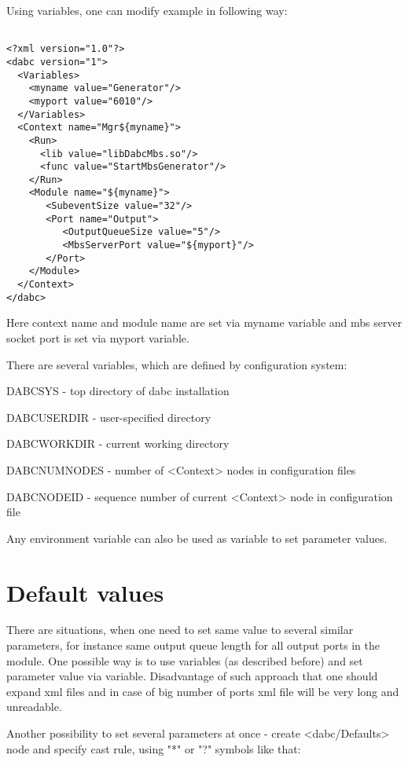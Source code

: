 Using variables, one can modify example in following way:

\begin{verbatim}

<?xml version="1.0"?>
<dabc version="1">
  <Variables>
    <myname value="Generator"/> 
    <myport value="6010"/> 
  </Variables>
  <Context name="Mgr${myname}">
    <Run>
      <lib value="libDabcMbs.so"/>
      <func value="StartMbsGenerator"/>
    </Run>
    <Module name="${myname}">
       <SubeventSize value="32"/>
       <Port name="Output">
          <OutputQueueSize value="5"/>
          <MbsServerPort value="${myport}"/>
       </Port>
    </Module>
  </Context>
</dabc>

\end{verbatim}

Here context name and module name are set via myname variable and mbs server 
socket port is set via myport variable.

There are several variables, which are defined by configuration system:

\bbul
\item DABCSYS - top directory of dabc installation
\item DABCUSERDIR - user-specified directory
\item DABCWORKDIR - current working directory
\item DABCNUMNODES - number of <Context> nodes in configuration files
\item DABCNODEID - sequence number of current <Context> node in configuration file 
\ebul

Any environment variable can also be used as variable to set parameter values. 


\section{Default values}

There are situations, when one need to set same value to several similar parameters,
for instance same output queue length for all output ports in the module. One possible way
is to use variables (as described before) and set parameter value via variable. 
Disadvantage of such approach that one should expand xml files and in case 
of big number of ports xml file will be very long and unreadable.

Another possibility to set several parameters at once - create <dabc/Defaults> node and
specify cast rule, using "*" or "?" symbols like that: 

